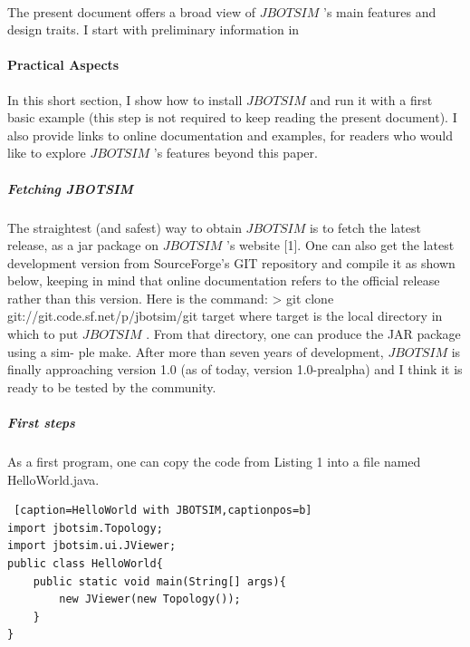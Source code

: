 \paragraph{}The present document offers a broad view of  $JBOTSIM$ ’s main features and design traits. I start with preliminary information in
\paragraph{Practical Aspects}In this short section, I show how to install $JBOTSIM$ and run it with a first basic example (this step is not required to keep reading the present document). I also provide links to online documentation and examples, for readers who would like to explore  $JBOTSIM$ ’s features beyond this paper.
\subparagraph{Fetching JBOTSIM}The straightest (and safest) way to obtain $JBOTSIM$ is to fetch the latest release, as a jar package on  $JBOTSIM$ ’s website [1]. One can also get the latest development version from SourceForge’s GIT repository and compile it as shown below, keeping in mind that online documentation refers to the official release rather than this version. Here is the command: > git clone git://git.code.sf.net/p/jbotsim/git target where target is the local directory in which to put  $JBOTSIM$ . From that directory, one can produce the JAR package using a sim- ple make. After more than seven years of development, $JBOTSIM$ is finally approaching version 1.0 (as of today, version 1.0-prealpha) and I think it is ready to be tested by the community.
\subparagraph{First steps}As a first program, one can copy the code from Listing 1 into a file named HelloWorld.java.


\begin{lstlisting} [caption=HelloWorld with JBOTSIM,captionpos=b]
import jbotsim.Topology;
import jbotsim.ui.JViewer;
public class HelloWorld{
	public static void main(String[] args){
		new JViewer(new Topology());
	} 
}
\end{lstlisting}

